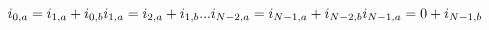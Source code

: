\documentclass[10pt]{article}
\begin{document}
\[\hspace{-15pt}i_{0,a} = i_{1,a} + i_{0,b} \\
i_{1,a} = i_{2,a} + i_{1,b} \\
...\\
i_{N-2,a} = i_{N-1,a} + i_{N-2,b} \\
i_{N-1,a} = 0 + i_{N-1,b} \\
\]
\end{document}
